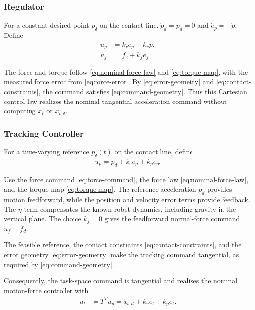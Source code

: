 \documentclass[10pt,journal,letterpaper]{IEEEtran}
\begin{document}
\subsubsection{Regulator}

For a constant desired point $p_d$ on the contact line, $\dot p_d=\ddot p_d=0$ and $\dot e_p=-\dot p$. Define
\begin{align}
u_p&=k_pe_p-k_v\dot p,\label{eq:regulation-command}\\
u_f&=f_d+k_fe_f.\label{eq:force-command}
\end{align}

The force and torque follow \eqref{eq:nominal-force-law} and \eqref{eq:torque-map}, with the measured force error from \eqref{eq:force-error}. By \eqref{eq:error-geometry} and \eqref{eq:contact-constraints}, the command satisfies \eqref{eq:command-geometry}. Thus this Cartesian control law realizes the nominal tangential acceleration command without computing $x_t$ or $x_{t,d}$.

\subsubsection{Tracking Controller}

For a time-varying reference $p_d(t)$ on the contact line, define
\begin{equation}\label{eq:tracking-command}
\begin{aligned}
u_p=\ddot p_d+k_v\dot e_p+k_pe_p.
\end{aligned}
\end{equation}

Use the force command \eqref{eq:force-command}, the force law \eqref{eq:nominal-force-law}, and the torque map \eqref{eq:torque-map}. The reference acceleration $\ddot p_d$ provides motion feedforward, while the position and velocity error terms provide feedback. The $\eta$ term compensates the known robot dynamics, including gravity in the vertical plane. The choice $k_f=0$ gives the feedforward normal-force command $u_{f}=f_d$.

The feasible reference, the contact constraints \eqref{eq:contact-constraints}, and the error geometry \eqref{eq:error-geometry} make the tracking command tangential, as required by \eqref{eq:command-geometry}.

Consequently, the task-space command is tangential and realizes the nominal motion-force controller with
\begin{equation}\label{eq:intrinsic-command}
\begin{aligned}
u_{t}&=T^Tu_{p}
=\ddot x_{t,d}+k_v\dot e_t+k_pe_t.
\end{aligned}
\end{equation}
\end{document}
